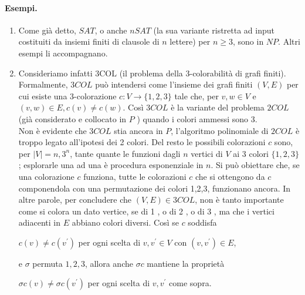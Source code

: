 \paragraph{Esempi.}
\begin{enumerate}
    \item Come già detto, $S A T$, o anche $n S A T$ (la sua variante ristretta
          ad input costituiti da insiemi finiti di clausole di $n$ lettere) per $n
              \geq 3$, sono in $N P$. Altri esempi li accompagnano.

    \item Consideriamo infatti $3 \mathrm{COL}$ (il problema della
          3-colorabilità di grafi finiti). Formalmente, $3 C O L$ può intendersi
          come l'insieme dei grafi finiti $(V, E)$ per cui esiste una
          3-colorazione $c: V \rightarrow\{1,2,3\}$ tale che, per $v, w \in V$ e
          $(v, w) \in E, c(v) \neq c(w)$. Così $3 C O L$ è la variante del
          problema $2 C O L$ (già considerato e collocato in $P$ ) quando i
          colori ammessi sono 3.\\
          Non è evidente che $3 C O L$ stia ancora in
          $P$, l'algoritmo polinomiale di $2 C O L$ è troppo legato all'ipotesi
          dei 2 colori. Del resto le possibili colorazioni $c$ sono, per $|V|=n,
              3^n$, tante quante le funzioni dagli $n$ vertici di $V$ ai 3 colori
          $\{1,2,3\}$; esplorarle una ad una è procedura esponenziale in $n$. Si
          può obiettare che, se una colorazione $c$ funziona, tutte le
          colorazioni $c$ che si ottengono da $c$ componendola con una
          permutazione dei colori 1,2,3, funzionano ancora. In altre parole, per
          concludere che $(V, E) \in 3 C O L$, non è tanto importante come si
          colora un dato vertice, se di 1 , o di 2 , o di 3 , ma che i vertici
          adiacenti in $E$ abbiano colori diversi. Così se $c$ soddisfa
          \begin{center}
              $c(v)
                  \neq c\left(v^{\prime}\right)$ per ogni scelta di $v, v^{\prime} \in
                  V$ con $\left(v, v^{\prime}\right) \in E$,
          \end{center}
          e $\sigma$ permuta $1,2,3$,
          allora anche $\sigma c$ mantiene la proprietà
          \begin{center}
              $\sigma c(v) \neq \sigma
                  c\left(v^{\prime}\right)$ per ogni scelta di $v, v^{\prime}$ come
              sopra.
          \end{center}

\end{enumerate}
